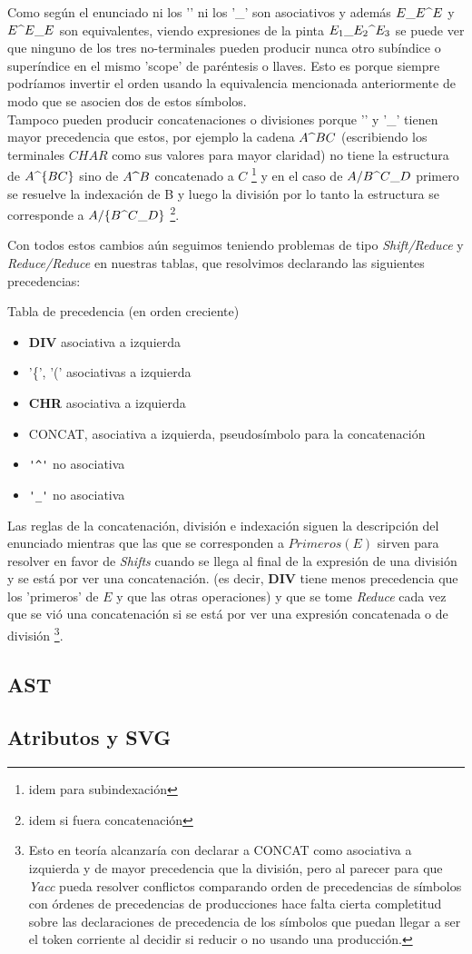 Como según el enunciado ni los '\super ' ni los '_' son asociativos y además $E\sub  E \super  E$ y $E\super  E \sub  E$ son equivalentes, viendo expresiones de la pinta $E_1 \sub  E_2 \super  E_3$ se puede ver que ninguno de los tres no-terminales pueden producir nunca otro subíndice o superíndice en el mismo 'scope' de paréntesis o llaves. Esto es porque siempre podríamos invertir el orden usando la equivalencia mencionada anteriormente de modo que se asocien dos de estos símbolos. \\
Tampoco pueden producir concatenaciones o divisiones porque '\super' y '_' tienen mayor precedencia que estos, por ejemplo la cadena $A\super BC$ (escribiendo los terminales $CHAR$ como sus valores para mayor claridad) no tiene la estructura de $A\super \{BC\}$ sino de $A\super B$ concatenado a $C$ \footnote{idem para subindexación} y en el caso de $A/B\super C\sub D$ primero se resuelve la indexación de B y luego la división por lo tanto la estructura se corresponde a $A/\{B\super C\sub D\}$ \footnote {idem si fuera concatenación}.

Con todos estos cambios aún seguimos teniendo problemas de tipo \emph{Shift/Reduce} y \emph{Reduce/Reduce} en nuestras tablas, que resolvimos declarando las siguientes precedencias:

Tabla de precedencia (en orden creciente)
\begin{itemize}
	\item \textbf{DIV} asociativa a izquierda

    \item '\{', '(' asociativas a izquierda
    \item \textbf{CHR} asociativa a izquierda
    \item CONCAT, asociativa a izquierda, pseudosímbolo para la concatenación
    \item \verb|'^'| no asociativa
    \item \verb|'_'| no asociativa
\end{itemize}

Las reglas de la concatenación, división e indexación siguen la descripción del enunciado mientras que las que se corresponden a $Primeros(E)$ sirven para resolver en favor de \emph{Shifts} cuando se llega al final de la expresión de una división y se está por ver una concatenación. (es decir, \textbf{DIV} tiene menos precedencia que los 'primeros' de $E$ y que las otras operaciones) y que se tome \emph{Reduce} cada vez que se vió una concatenación si se está por ver una expresión concatenada o de división \footnote{Esto en teoría alcanzaría con declarar a CONCAT como asociativa a izquierda y de mayor precedencia que la división, pero al parecer para que \emph{Yacc} pueda resolver conflictos comparando orden de precedencias de símbolos con órdenes de precedencias de producciones hace falta cierta completitud sobre las declaraciones de precedencia de los símbolos que puedan llegar a ser el token corriente al decidir si reducir o no usando una producción.}.

\subsection{AST}

\subsection{Atributos y SVG}
